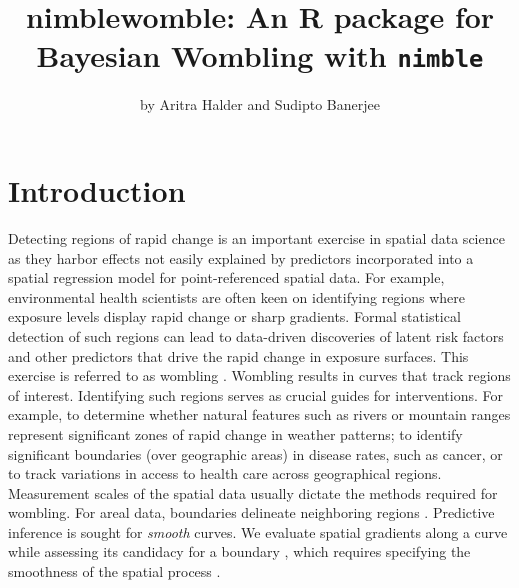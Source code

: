 

\title{nimblewomble: An R package for Bayesian Wombling with \texttt{nimble}}
\author{by Aritra Halder and Sudipto Banerjee}

\maketitle



\section{Introduction}\label{sec:intro}
Detecting regions of rapid change is an important exercise in spatial data science as they harbor effects not easily explained by predictors incorporated into a spatial regression model for point-referenced spatial data. For example, environmental health scientists are often keen on identifying regions where exposure levels display rapid change or sharp gradients. Formal statistical detection of such regions can lead to data-driven discoveries of latent risk factors and other predictors that drive the rapid change in exposure surfaces.  
 This exercise is referred to as wombling \citep[][]{womble_differential_1951,gleyze2001wombling,banerjee2010handbook}. { Wombling results in curves that track regions of interest. Identifying such regions serves as crucial guides for interventions. For example, to determine whether natural features such as rivers or mountain ranges represent significant zones of rapid change in weather patterns; to identify significant boundaries (over geographic areas) in disease rates, such as cancer, or to track variations in access to health care across geographical regions.} Measurement scales of the spatial data usually dictate the methods required for wombling. For areal data, boundaries delineate neighboring regions \citep[see, e.g.][]{gao_spatial_2023,wu_assessing_2025}. Predictive inference is sought for \emph{smooth} curves. We evaluate spatial gradients along a curve while assessing its candidacy for a boundary \citep[see, e.g.,][]{banerjee2006bayesian, qu_boundary_2021,halder2024bayesian}, which requires specifying the smoothness of the spatial process \citep[see, e.g.][]{kent_continuity_1989,banerjee_directional_2003}.

